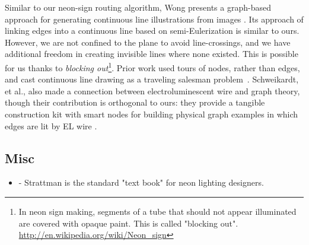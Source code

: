 Similar to our neon-sign routing algorithm, Wong presents a graph-based approach for generating continuous line illustrations from images \cite{Wong-continuousline}. Its approach of linking edges into a continuous line based on semi-Eulerization is similar to ours.  However, we are not confined to the plane to avoid line-crossings, and we have additional freedom in creating invisible lines where none existed.  This is possible for us thanks to \emph{blocking out}\footnote{In neon sign making, segments of a tube that should not appear illuminated are covered with opaque paint. This is called "blocking out". \url{http://en.wikipedia.org/wiki/Neon_sign}}. Prior work used tours of nodes, rather than edges, and cast continuous line drawing as a traveling salesman problem~\cite{Bosch-tsp}.  Schweikardt, et al., also made a connection between electroluminescent wire and graph theory, though their contribution is orthogonal to ours: they provide a tangible construction kit with smart nodes for building physical graph examples in which edges are lit by EL wire \cite{Schweikardt-tei09}.

\subsection{Misc}
\begin{itemize}
\item \cite{strattman1997neon} - Strattman is the standard "text book" for neon lighting designers.
\end{itemize}